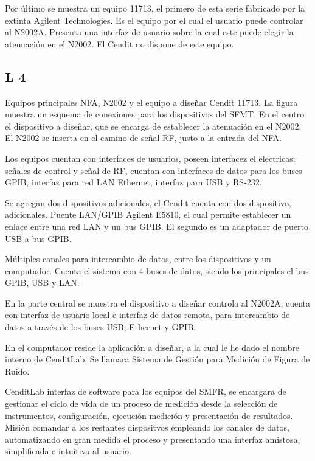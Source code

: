 \documentclass[paper=letter,oneside,fontsize=9pt]{scrartcl}
\begin{document}
	Por último se muestra un equipo 11713, el primero de esta serie fabricado por la extinta Agilent Technologies. Es el equipo por el cual el usuario puede controlar al N2002A. Presenta una interfaz de usuario sobre la cual este puede elegir la atenuación en el N2002. El Cendit no dispone de este equipo.
	
	\subsection{L 4}
	
	Equipos principales NFA, N2002 y el equipo a diseñar Cendit 11713. 	La figura muestra un esquema de conexiones para los dispositivos del SFMT. En el centro el dispositivo a diseñar, que se encarga de establecer la atenuación en el N2002. El N2002 se inserta en el camino de señal RF, justo a la entrada del NFA.	
	
	Los equipos cuentan con interfaces de usuarios, poseen interfacez el electricas: señales de control y señal de RF,  cuentan con interfaces de datos para los buses GPIB, interfaz para red LAN Ethernet, interfaz para USB y RS-232. 
	
	Se agregan dos dispositivos adicionales, el Cendit cuenta con dos dispositivo, adicionales. Puente LAN/GPIB Agilent E5810, el cual permite establecer un enlace entre una red LAN y un bus GPIB. El segundo es un adaptador de puerto USB a bus GPIB.
	
	Múltiples canales para intercambio de datos, entre los dispositivos y un computador.  Cuenta el sistema con 4 buses de datos, siendo los principales el bus GPIB, USB y LAN.
	
	En la parte central se muestra el dispositivo a diseñar controla al N2002A, cuenta con interfaz de usuario local e interfaz de datos remota, para intercambio de datos a través de los buses USB, Ethernet y GPIB.
	
	En el computador reside la aplicación a diseñar, a la cual le he dado el nombre interno de CenditLab. Se llamara Sistema de Gestión para Medición de Figura de Ruido. 
	
	CenditLab interfaz de software para los equipos del SMFR, se encargara de gestionar el ciclo de vida de un proceso de medición desde la selección de instrumentos, configuración, ejecución medición y presentación de resultados. Misión comandar a los restantes dispositvos empleando los canales de datos, automatizando en gran medida el proceso y presentando una interfaz amistosa, simplificada e intuitiva al usuario.
	
\end{document}
